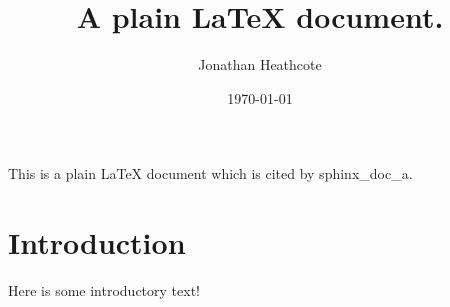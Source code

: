 \documentclass{article}
\title{A plain \LaTeX{} document.}
\author{Jonathan Heathcote}
\date{\today}
\begin{document}
    \maketitle
    
    This is a plain \LaTeX{} document which is cited by sphinx\_doc\_a.
    
    \label{latex-doc-intro}
    \section{Introduction}
        
        Here is some introductory text!
    
\end{document}
